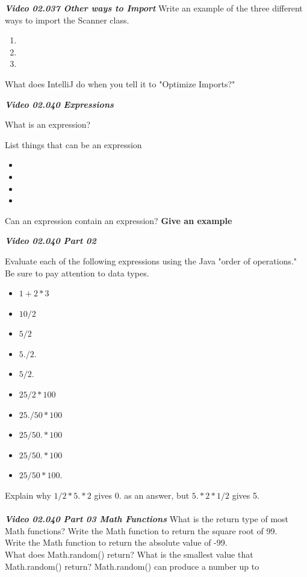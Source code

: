 \documentclass[letterpaper,11pt]{exam}
\newcommand{\videoheading}[1]{\Large\textbf{\textit{#1}}}
\begin{document}
\begin{questions}
\begin{samepage}
\videoheading{Video 02.037 Other ways to Import}
\question Write an example of the three different ways to import the Scanner class.
\begin{enumerate}
  \item
  \item
  \item
\end{enumerate}
\end{samepage}
\question What does IntelliJ do when you tell it to "Optimize Imports?"
\vspace{1cm}

\videoheading{Video 02.040 Expressions}

\question What is an expression?
\begin{samepage}
\question List things that can be an expression
\begin{itemize}
  \item 
  \item 
  \item 
  \item 
\end{itemize}
\end{samepage}
\question Can an expression contain an expression?  \textbf{Give an example}


\videoheading{Video 02.040 Part 02}
\begin{samepage}
\question Evaluate each of the following expressions using the Java "order of operations."  Be sure to pay attention to data types.
\begin{itemize}
  \item$1+2*3$
  \item$10/2$
  \item $5/2$
  \item $5./2.$
  \item $5/2.$
  \item $25/2*100$
  \item $25./50*100$
  \item $25/50.*100$
  \item $25/50.*100$
  \item $25/50*100.$
\end{itemize}
\end{samepage}
\question Explain why $1/2 * 5. * 2$ gives 0. as an answer, but $5. * 2 * 1/2$ gives 5.
\vspace{1cm}
\\\\
\videoheading{Video 02.040 Part 03 Math Functions}
\question What is the return type of most Math functions?
\question Write the Math function to return the square root of 99.
\\
\question Write the Math function to return the absolute value of -99.
\\
\question What does Math.random() return?
\question What is the smallest value that Math.random() return?
\question Math.random() can produce a number up to \hrulefill


\end{questions}
\end{document}

